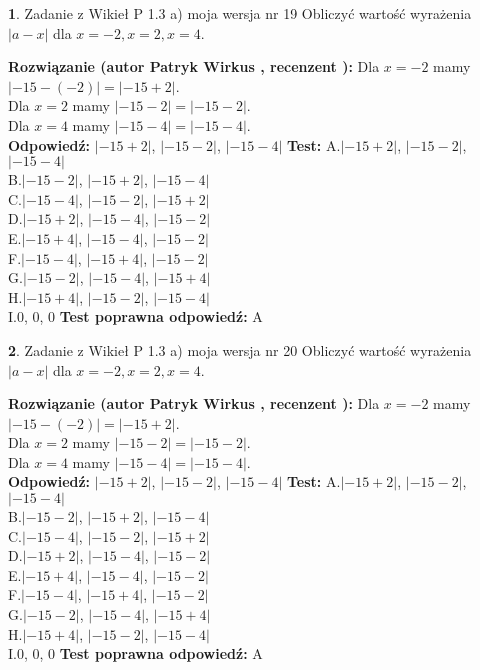 \documentclass[12pt, a4paper]{article}
\theoremstyle{definition} %
\newtheorem{zad}{}
\newcommand{\zadStart}[1]{\begin{zad}#1\newline}
\newcommand{\zadStop}{\end{zad}}
\newcommand{\rozwStart}[2]{\noindent \textbf{Rozwiązanie (autor #1 , recenzent #2): }\newline}
\newcommand{\rozwStop}{\newline}
\newcommand{\odpStart}{\noindent \textbf{Odpowiedź:}\newline}
\newcommand{\odpStop}{\newline}
\newcommand{\testStart}{\noindent \textbf{Test:}\newline}
\newcommand{\testStop}{\newline}
\newcommand{\kluczStart}{\noindent \textbf{Test poprawna odpowiedź:}\newline}
\newcommand{\kluczStop}{\newline}
\begin{document}
\zadStart{Zadanie z Wikieł P 1.3 a) moja wersja nr 19}
Obliczyć wartość wyrażenia $|a - x|$ dla $x=-2,x=2,x=4$.
\zadStop
\rozwStart{Patryk Wirkus}{}
Dla $x = -2$ mamy $|-15 - (-2)| = |-15 + 2|$.\\
Dla $x = 2$ mamy $|-15 - 2| = |-15 - 2|$.\\
Dla $x = 4$ mamy $|-15 - 4| = |-15 - 4|$.\\
\rozwStop
\odpStart
$|-15 + 2|$, $|-15 - 2|$, $|-15 - 4|$
\odpStop
\testStart
A.$|-15 + 2|$, $|-15 - 2|$, $|-15 - 4|$\\
B.$|-15 - 2|$, $|-15 + 2|$, $|-15 - 4|$\\
C.$|-15 - 4|$, $|-15 - 2|$, $|-15 + 2|$\\
D.$|-15 + 2|$, $|-15 - 4|$, $|-15 - 2|$\\
E.$|-15 + 4|$, $|-15 - 4|$, $|-15 - 2|$\\
F.$|-15 - 4|$, $|-15 + 4|$, $|-15 - 2|$\\
G.$|-15 - 2|$, $|-15 - 4|$, $|-15 + 4|$\\
H.$|-15 + 4|$, $|-15 - 2|$, $|-15 - 4|$\\
I.$0$, $0$, $0$
\testStop
\kluczStart
A
\kluczStop



\zadStart{Zadanie z Wikieł P 1.3 a) moja wersja nr 20}
Obliczyć wartość wyrażenia $|a - x|$ dla $x=-2,x=2,x=4$.
\zadStop
\rozwStart{Patryk Wirkus}{}
Dla $x = -2$ mamy $|-15 - (-2)| = |-15 + 2|$.\\
Dla $x = 2$ mamy $|-15 - 2| = |-15 - 2|$.\\
Dla $x = 4$ mamy $|-15 - 4| = |-15 - 4|$.\\
\rozwStop
\odpStart
$|-15 + 2|$, $|-15 - 2|$, $|-15 - 4|$
\odpStop
\testStart
A.$|-15 + 2|$, $|-15 - 2|$, $|-15 - 4|$\\
B.$|-15 - 2|$, $|-15 + 2|$, $|-15 - 4|$\\
C.$|-15 - 4|$, $|-15 - 2|$, $|-15 + 2|$\\
D.$|-15 + 2|$, $|-15 - 4|$, $|-15 - 2|$\\
E.$|-15 + 4|$, $|-15 - 4|$, $|-15 - 2|$\\
F.$|-15 - 4|$, $|-15 + 4|$, $|-15 - 2|$\\
G.$|-15 - 2|$, $|-15 - 4|$, $|-15 + 4|$\\
H.$|-15 + 4|$, $|-15 - 2|$, $|-15 - 4|$\\
I.$0$, $0$, $0$
\testStop
\kluczStart
A
\kluczStop
\end{document}
